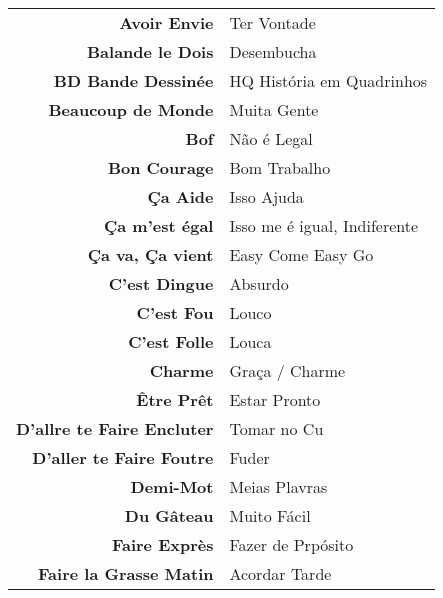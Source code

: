 \documentclass{article}
\begin{document}
        \begin{center}
            \begin{tabular}{r l}
                \textbf{Avoir Envie}                                    & Ter Vontade\\
                \textbf{Balande le Dois}                                & Desembucha\\
                \textbf{BD Bande Dessinée}                              & HQ História em Quadrinhos\\
                \textbf{Beaucoup de Monde}                              & Muita Gente\\
                \textbf{Bof}                                            & Não é Legal\\
                \textbf{Bon Courage}                                    & Bom Trabalho\\
                \textbf{Ça Aide}                                        & Isso Ajuda\\
                \textbf{Ça m'est égal}                                  & Isso me é igual, Indiferente\\
                \textbf{Ça va, Ça vient}                                & Easy Come Easy Go\\
                \textbf{C'est Dingue}                                   & Absurdo\\
                \textbf{C'est Fou}                                      & Louco\\
                \textbf{C'est Folle}                                    & Louca\\
                \textbf{Charme}                                         & Graça / Charme\\
                \textbf{Être Prêt}                                      & Estar Pronto\\
                \textbf{D'allre te Faire Encluter}                      & Tomar no Cu\\
                \textbf{D'aller te Faire Foutre}                        & Fuder\\
                \textbf{Demi-Mot}                                       & Meias Plavras\\
                \textbf{Du Gâteau}                                      & Muito Fácil\\
                \textbf{Faire Exprès}                                   & Fazer de Prpósito\\
                \textbf{Faire la Grasse Matin}                          & Acordar Tarde\\

\end{tabular}
\end{center}
\end{document}
